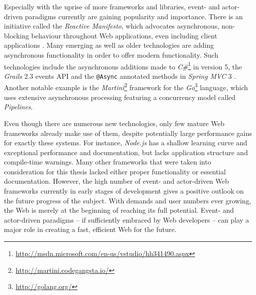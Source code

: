 Especially with the uprise of more frameworks and libraries, event- and actor-driven paradigms currently are gaining popularity and importance. There is an initiative called the \textit{Reactive Manifesto}, which advocates asynchronous, non-blocking behaviour throughout Web applications, even including client applications \cite{reactive}. Many emerging as well as older technologies are adding asynchronous functionality in order to offer modern functionality. Such technologies include the asynchronous additions made to \textit{C\#}\footnote{\url{http://msdn.microsoft.com/en-us/vstudio/hh341490.aspx}} in version 5, the \textit{Grails} 2.3 events API and the \texttt{@Async} annotated methods in \textit{Spring MVC} 3 \cite{Syme1983} \cite{Ledbrook2013}. Another notable example is the \textit{Martini}\footnote{\url{http://martini.codegangsta.io/}} framework for the \textit{Go}\footnote{\url{http://golang.org/}} language, which uses extensive asynchronous processing featuring a concurrency model called \textit{Pipelines}.

Even though there are numerous new technologies, only few mature Web frameworks already make use of them, despite potentially large performance gains for exactly these systems. For instance, \textit{Node.js} has a shallow learning curve and exceptional performance and documentation, but lacks application structure and compile-time warnings. Many other frameworks that were taken into consideration for this thesis lacked either proper functionality or essential documentation. However, the high number of event- and actor-driven Web frameworks currently in early stages of development gives a positive outlook on the future progress of the subject. With demands and user numbers ever growing, the Web is merely at the beginning of reaching its full potential. Event- and actor-driven paradigms -- if sufficiently embraced by Web developers -- can play a major role in creating a fast, efficient Web for the future.